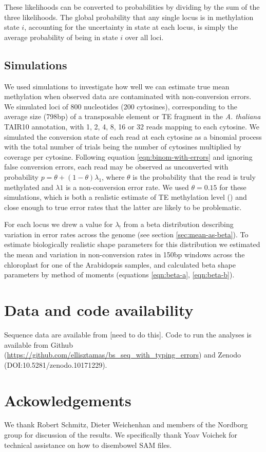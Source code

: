 \documentclass[twocolumn,twoside,lettersize]{article}
\begin{document}
These likelihoods can be converted to probabilities by dividing by the sum of the three likelihoods.
The global probability that any single locus is in methylation state $i$, accounting for the uncertainty in state at each locus, is simply the average probability of being in state $i$ over all loci.

\subsection{Simulations}

We used simulations to investigate how well we can estimate true mean methylation when observed data are contaminated with non-conversion errors.
We simulated loci of 800 nucleotides (200 cytosines), corresponding to the average size (798bp) of a transposable element or TE fragment in the \textit{A. thaliana} TAIR10 annotation, with 1, 2, 4, 8, 16 or 32 reads mapping to each cytosine.
We simulated the conversion state of each read at each cytosine as a binomial process with the total number of trials being the number of cytosines multiplied by coverage per cytosine.
Following equation \ref{eqn:binom-with-errors} and ignoring false conversion errors, each read may be observed as unconverted with probability $p=\theta + (1-\theta)\lambda_1$, where $\theta$ is the probability that the read is truly methylated and $\lambda1$ is a non-conversion error rate.
We used $\theta=0.15$ for these simulations, which is both a realistic estimate of TE methylation level (\cite{dubin2015dna}) and close enough to true error rates that the latter are likely to be problematic.

For each locus we drew a value for $\lambda_!$ from a beta distribution describing variation in error rates across the genome (see section \ref{sec:mean-as-beta}).
To estimate biologically realistic shape parameters for this distribution we estimated the mean and variation in non-conversion rates in 150bp windows across the chloroplast for one of the Arabidopsis samples, and calculated beta shape parameters by method of moments (equations \ref{eqn:beta-a}, \ref{eqn:beta-b}).

\section{Data and code availability}

Sequence data are available from [need to do this].
Code to run the analyses is available from Github (\url{https://github.com/ellisztamas/bs_seq_with_typing_errors}) and Zenodo (DOI:10.5281/zenodo.10171229).

\section{Ackowledgements}

We thank Robert Schmitz, Dieter Weichenhan and members of the Nordborg group for discussion of the results.
We specifically thank Yoav Voichek for technical assistance on how to disembowel SAM files.

\printbibliography %
\end{document}
